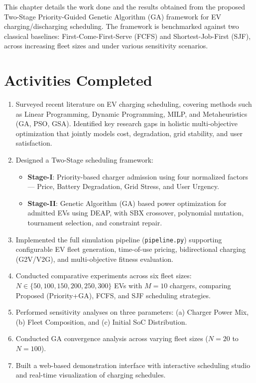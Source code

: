 
\noindent This chapter details the work done and the results obtained from the proposed Two-Stage Priority-Guided Genetic Algorithm (GA) framework for EV charging/discharging scheduling. The framework is benchmarked against two classical baselines: First-Come-First-Serve (FCFS) and Shortest-Job-First (SJF), across increasing fleet sizes and under various sensitivity scenarios.

\section{Activities Completed}
\begin{enumerate}
    \item Surveyed recent literature on EV charging scheduling, covering methods such as Linear Programming, Dynamic Programming, MILP, and Metaheuristics (GA, PSO, GSA). Identified key research gaps in holistic multi-objective optimization that jointly models cost, degradation, grid stability, and user satisfaction.
    \item Designed a Two-Stage scheduling framework:
    \begin{itemize}
        \item \textbf{Stage-I}: Priority-based charger admission using four normalized factors --- Price, Battery Degradation, Grid Stress, and User Urgency.
        \item \textbf{Stage-II}: Genetic Algorithm (GA) based power optimization for admitted EVs using DEAP, with SBX crossover, polynomial mutation, tournament selection, and constraint repair.
    \end{itemize}
    \item Implemented the full simulation pipeline (\texttt{pipeline.py}) supporting configurable EV fleet generation, time-of-use pricing, bidirectional charging (G2V/V2G), and multi-objective fitness evaluation.
    \item Conducted comparative experiments across six fleet sizes: $N \in \{50, 100, 150, 200, 250, 300\}$ EVs with $M = 10$ chargers, comparing Proposed (Priority+GA), FCFS, and SJF scheduling strategies.
    \item Performed sensitivity analyses on three parameters: (a) Charger Power Mix, (b) Fleet Composition, and (c) Initial SoC Distribution.
    \item Conducted GA convergence analysis across varying fleet sizes ($N = 20$ to $N = 100$).
    \item Built a web-based demonstration interface with interactive scheduling studio and real-time visualization of charging schedules.
\end{enumerate}

